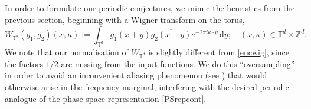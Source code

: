 \documentclass[11pt,reqno]{amsart}
\numberwithin{equation}{section}
\newcommand{\dd}{\,\mathrm{d}}
\begin{document}
In order to formulate our periodic conjectures, we mimic the heuristics from the previous section, beginning with a Wigner transform on the torus,
\begin{equation*}%
W_{\mathbb{T}^{d}}(g_1,g_2)(x,\kappa):=\int_{\mathbb{T}^d}g_1(x+y)\overline{g_2(x-y)} e^{-2\pi i \kappa\cdot y}\dd y; \quad (x,\kappa)\in\mathbb{T}^d\times\mathbb{Z}^d.
\end{equation*}
We note that our normalisation of $W_{\mathbb{T}^d}$ is slightly different from \eqref{eucwig}, since the factors $1/2$ are missing from the input functions.
We do this ``oversampling'' in order to avoid an inconvenient aliasing phenomenon (see \cite{CM}) that would otherwise arise in the frequency marginal, interfering with the desired periodic analogue of the phase-space representation \eqref{PSrepcont}. 
\end{document}
